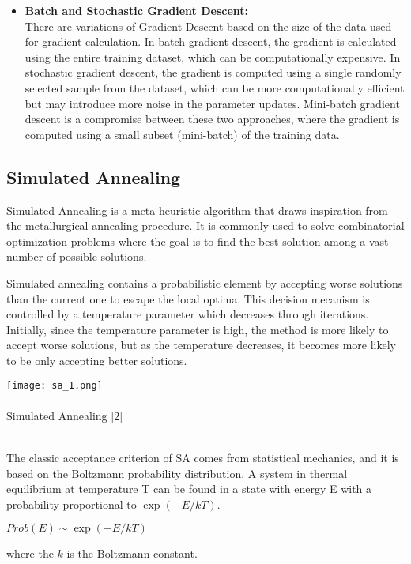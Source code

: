 \documentclass[conference]{IEEEtran}
\begin{document}
\begin{itemize}
    \item \textbf{Batch and Stochastic Gradient Descent:} \\
    There are variations of Gradient Descent based on the size of the data used for gradient calculation. In batch gradient descent, the gradient is calculated using the entire training dataset, which can be computationally expensive. In stochastic gradient descent, the gradient is computed using a single randomly selected sample from the dataset, which can be more computationally efficient but may introduce more noise in the parameter updates. Mini-batch gradient descent is a compromise between these two approaches, where the gradient is computed using a small subset (mini-batch) of the training data.
\end{itemize}

\subsection{Simulated Annealing}
Simulated Annealing is a meta-heuristic algorithm that draws inspiration from the metallurgical annealing procedure. It is commonly used to solve combinatorial optimization problems where the goal is to find the best solution among a vast number of possible solutions.

Simulated annealing contains a probabilistic element by accepting worse solutions than the current one to escape the local optima. This decision mecanism is controlled by a temperature parameter which decreases through iterations. Initially, since the temperature parameter is high, the method is more likely to accept worse solutions, but as the temperature decreases, it becomes more likely to be only accepting better solutions.
\begin{center}
    \texttt{[image: sa\_1.png]}\\ \ \\
    \footnotesize{Simulated Annealing [2]}
\end{center}\\ 


The classic acceptance criterion of SA comes from statistical mechanics, and it is based on the Boltzmann probability distribution. A system in thermal equilibrium at temperature T can be found in a state with energy E with a probability proportional to $\exp (-E / k T)$.
\begin{center}
    $Prob(E) \sim \exp(-E/kT)$
\end{center}
where the $k$ is the Boltzmann constant.
\end{document}
